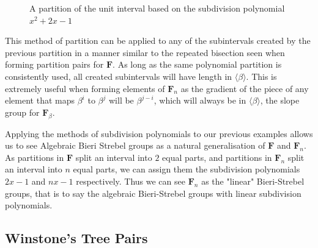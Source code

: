 \documentclass[
11pt, %
english, %
singlespacing, %
parskip, %
headsepline, %
]{amsart} %
\theoremstyle{definition}
\newcommand{\TF}{\textbf{F}}
\newcommand{\FN}[1]{$\textbf{F}_{#1}$}
\begin{document}
\begin{center}
\begin{figure}[H]
\centering
{}
\caption{A partition of the unit interval based on the subdivision polynomial $x^2 + 2x -1$}
\end{figure}
\end{center}

This method of partition can be applied to any of the subintervals created by the previous partition in a manner similar to the repeated bisection seen when forming partition pairs for $\TF$. As long as the same polynomial partition is consistently used, all created subintervals will have length in $\langle \beta \rangle$. This is extremely useful when forming elements of \FN{n} as the gradient of the piece of any element that maps $\beta^i$ to $\beta^j$ will be $\beta^{j-i}$, which will always be in $\langle \beta \rangle$, the slope group for \FN{\beta}.
\par
Applying the methods of subdivision polynomials to our previous examples allows us to see Algebraic Bieri Strebel groups as a natural generalisation of $\TF$ and \FN{n}. As partitions in $\TF$ split an interval into $2$ equal parts, and partitions in \FN{n} split an interval into $n$ equal parts, we can assign them the subdivision polynomials $2x-1$ and $nx-1$ respectively. Thus we can see \FN{n} as the "linear" Bieri-Strebel groups, that is to say the algebraic Bieri-Strebel groups with linear subdivision polynomials.

\subsection{Winstone's Tree Pairs}\label{wintree}
\end{document}
